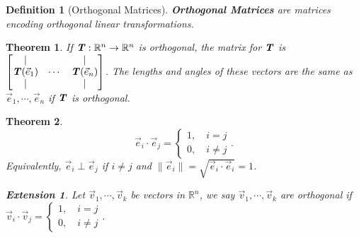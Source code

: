 \documentclass[12pt, a4paper]{article}
\newtheorem{thm}{Theorem}[subsection]
\newtheorem{df}{Definition}[subsection]
\newtheorem*{ext}{\indent Extension}
\def\R{{\mathbb{R}}}
\def\T{{\textbf{\emph{T}}}}
\def\vecv{\vec{v}}
\def\vece{\vec{e}}
\begin{document}
\begin{df}[Orthogonal Matrices]
	\textbf{Orthogonal Matrices} are matrices encoding orthogonal linear transformations.	
\end{df}
\begin{thm}
	If $\T:\R^n\to\R^n$ is orthogonal, the matrix for $\T$ is $\begin{bmatrix}|&&|\\\T(\vece_1)&\cdots&\T(\vece_n)\\|&&|\end{bmatrix}$. The lengths and angles of these vectors are the same as $\vece_1,\cdots,\vece_n$ if $\T$ is orthogonal. 
\end{thm}
\begin{thm}
	\[\vece_i\cdot\vece_j=\begin{cases}1,\quad i=j\\0,\quad i\neq j\end{cases}.\]
	Equivalently, $\vece_i\perp\vece_j$ if $i\neq j$ and $\|\vece_i\|=\sqrt{\vece_i\cdot\vece_i}=1$.
	\begin{ext}
		Let $\vecv_1,\cdots,\vecv_k$	 be vectors in $\R^n$, we say $\vecv_1,\cdots,\vecv_k$	 are orthogonal if $\vecv_i\cdot\vecv_j=\begin{cases}1,\quad i=j\\0,\quad i\neq j\end{cases}$.
	\end{ext}
\end{thm}
\end{document}
